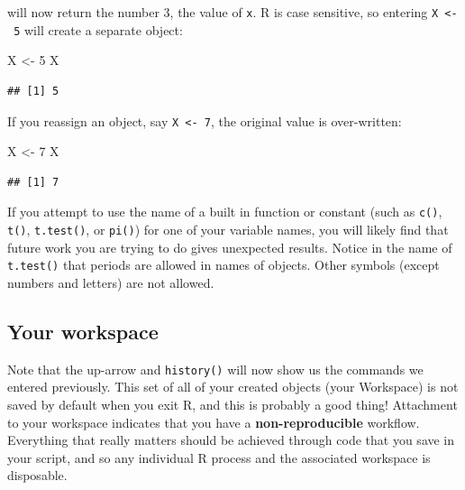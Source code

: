 \documentclass[
]{book}
\newenvironment{Shaded}{\begin{snugshade}}{\end{snugshade}}
\newcommand{\DecValTok}[1]{\textcolor[rgb]{0.00,0.00,0.81}{#1}}
\newcommand{\NormalTok}[1]{#1}
\newcommand{\OtherTok}[1]{\textcolor[rgb]{0.56,0.35,0.01}{#1}}
\begin{document}
will now return the number 3, the value of \texttt{x}. R is case sensitive, so entering \texttt{X\ \textless{}-\ 5} will create a separate object:

\begin{Shaded}
\begin{Highlighting}[]
\NormalTok{X }\OtherTok{\textless{}{-}} \DecValTok{5}
\NormalTok{X}
\end{Highlighting}
\end{Shaded}

\begin{verbatim}
## [1] 5
\end{verbatim}

If you reassign an object, say \texttt{X\ \textless{}-\ 7}, the original value is over-written:

\begin{Shaded}
\begin{Highlighting}[]
\NormalTok{X }\OtherTok{\textless{}{-}} \DecValTok{7}
\NormalTok{X}
\end{Highlighting}
\end{Shaded}

\begin{verbatim}
## [1] 7
\end{verbatim}

If you attempt to use the name of a built in function or constant (such as \texttt{c()}, \texttt{t()}, \texttt{t.test()}, or \texttt{pi()}) for one of your variable names, you will likely find that future work you are trying to do gives unexpected results. Notice in the name of \texttt{t.test()} that periods are allowed in names of objects. Other symbols (except numbers and letters) are not allowed.

\hypertarget{your-workspace}{%
\subsection*{Your workspace}\label{your-workspace}}

Note that the up-arrow and \texttt{history()} will now show us the commands we entered previously. This set of all of your created objects (your Workspace) is not saved by default when you exit R, and this is probably a good thing! Attachment to your workspace indicates that you have a \textbf{non-reproducible} workflow. Everything that really matters should be achieved through code that you save in your script, and so any individual R process and the associated workspace is disposable.
\end{document}
